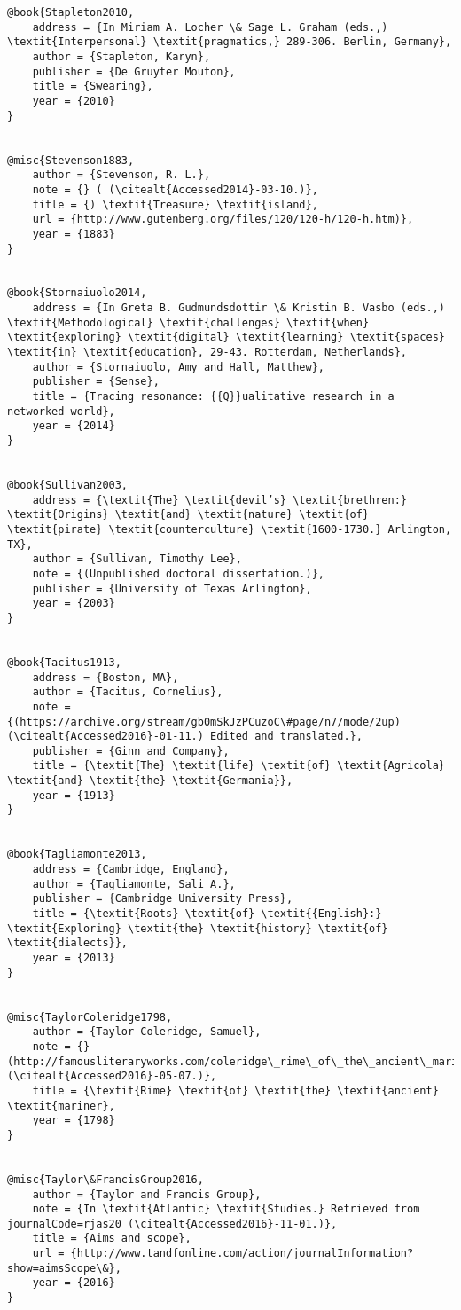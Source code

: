\begin{verbatim}
@book{Stapleton2010,
	address = {In Miriam A. Locher \& ‎Sage L. Graham (eds.,) \textit{Interpersonal} \textit{pragmatics,} 289-306. Berlin, Germany},
	author = {Stapleton, Karyn},
	publisher = {De Gruyter Mouton},
	title = {Swearing},
	year = {2010}
}


@misc{Stevenson1883,
	author = {Stevenson, R. L.},
	note = {} ( (\citealt{Accessed2014}-03-10.)},
	title = {) \textit{Treasure} \textit{island},
	url = {http://www.gutenberg.org/files/120/120-h/120-h.htm)},
	year = {1883}
}


@book{Stornaiuolo2014,
	address = {In Greta B. Gudmundsdottir \& Kristin B. Vasbo (eds.,) \textit{Methodological} \textit{challenges} \textit{when} \textit{exploring} \textit{digital} \textit{learning} \textit{spaces} \textit{in} \textit{education}, 29-43. Rotterdam, Netherlands},
	author = {Stornaiuolo, Amy and Hall, Matthew},
	publisher = {Sense},
	title = {Tracing resonance: {{Q}}ualitative research in a networked world},
	year = {2014}
}


@book{Sullivan2003,
	address = {\textit{The} \textit{devil’s} \textit{brethren:} \textit{Origins} \textit{and} \textit{nature} \textit{of} \textit{pirate} \textit{counterculture} \textit{1600-1730.} Arlington, TX},
	author = {Sullivan, Timothy Lee},
	note = {(Unpublished doctoral dissertation.)},
	publisher = {University of Texas Arlington},
	year = {2003}
}


@book{Tacitus1913,
	address = {Boston, MA},
	author = {Tacitus, Cornelius},
	note = {(https://archive.org/stream/gb0mSkJzPCuzoC\#page/n7/mode/2up) (\citealt{Accessed2016}-01-11.) Edited and translated.},
	publisher = {Ginn and Company},
	title = {\textit{The} \textit{life} \textit{of} \textit{Agricola} \textit{and} \textit{the} \textit{Germania}},
	year = {1913}
}


@book{Tagliamonte2013,
	address = {Cambridge, England},
	author = {Tagliamonte, Sali A.},
	publisher = {Cambridge University Press},
	title = {\textit{Roots} \textit{of} \textit{{English}:} \textit{Exploring} \textit{the} \textit{history} \textit{of} \textit{dialects}},
	year = {2013}
}


@misc{TaylorColeridge1798,
	author = {Taylor Coleridge, Samuel},
	note = {} (http://famousliteraryworks.com/coleridge\_rime\_of\_the\_ancient\_mariner.htm) (\citealt{Accessed2016}-05-07.)},
	title = {\textit{Rime} \textit{of} \textit{the} \textit{ancient} \textit{mariner},
	year = {1798}
}


@misc{Taylor\&FrancisGroup2016,
	author = {Taylor and Francis Group},
	note = {In \textit{Atlantic} \textit{Studies.} Retrieved from  journalCode=rjas20 (\citealt{Accessed2016}-11-01.)},
	title = {Aims and scope},
	url = {http://www.tandfonline.com/action/journalInformation?show=aimsScope\&},
	year = {2016}
}



\end{verbatim}
